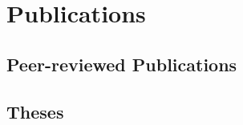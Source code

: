 \ifacademic
  \section{Publications}
  
  \subsection{Peer-reviewed Publications}
    \begin{refsection}
      \vspace{2mm}
      \onehalfspacing
      \nocite{
        GironsLopez2021,
        GironsLopez2020,
        Worman2020,
        DiBaldassarre2018,
        Breinl2017,
        GironsLopez2017,
        GironsLopez2016a,
        Mbanguka2016,
        GironsLopez2015
      }
      \printbibliography[heading=none]
    \end{refsection}

    
  
  \subsection{Theses}
    \begin{refsection}
      \vspace{2mm}
      \onehalfspacing
      \nocite{
        GironsLopez2016,
        GironsLopez2011
      }
      \printbibliography[heading=none]
    \end{refsection}
  
